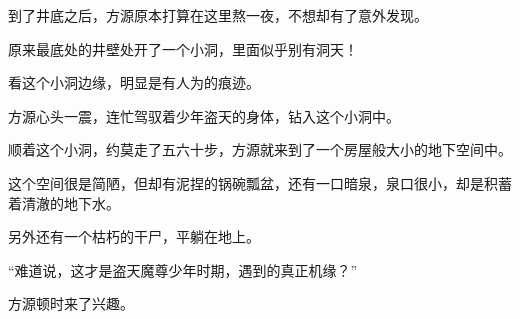 \begin{this_body}
到了井底之后，方源原本打算在这里熬一夜，不想却有了意外发现。

原来最底处的井壁处开了一个小洞，里面似乎别有洞天！

看这个小洞边缘，明显是有人为的痕迹。

方源心头一震，连忙驾驭着少年盗天的身体，钻入这个小洞中。

顺着这个小洞，约莫走了五六十步，方源就来到了一个房屋般大小的地下空间中。

这个空间很是简陋，但却有泥捏的锅碗瓢盆，还有一口暗泉，泉口很小，却是积蓄着清澈的地下水。

另外还有一个枯朽的干尸，平躺在地上。

“难道说，这才是盗天魔尊少年时期，遇到的真正机缘？”

方源顿时来了兴趣。

\end{this_body}

